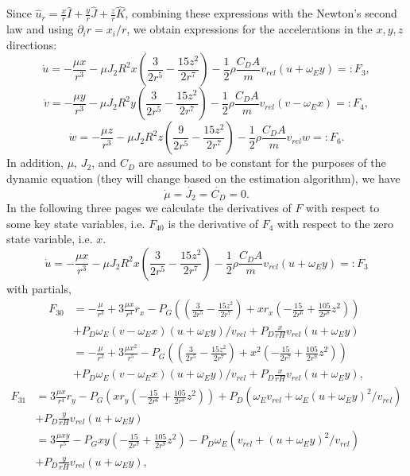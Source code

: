 \documentclass[]{article}
\begin{document}
Since $\hat{u}_r = \frac{x}{r} \hat{I} + \frac{y}{r} \hat{J} + \frac{z}{r} \hat{K}$, combining these expressions with the Newton's second law and using $\partial_i r = x_i/r$, we obtain expressions for the accelerations in the $x,y,z$ directions:
$$
\dot{u} = -\frac{\mu x}{r^3} - \mu J_2 R^2  x \left( \frac{3}{2r^5} - \frac{15z^2}{2r^7} \right) - \frac{1}{2} \rho \frac{C_D A}{m} v_{rel} \left(u + \omega_E y \right) =: F_3,
$$
$$
\dot{v} =  -\frac{\mu y}{r^3} - \mu J_2 R^2 y  \left( \frac{3}{2r^5} - \frac{15z^2}{2r^7} \right) - \frac{1}{2} \rho \frac{C_D A}{m} v_{rel}  \left(v - \omega_E x \right) =: F_4,
$$
$$
\dot{w} =  -\frac{\mu z}{r^3} - \mu J_2 R^2 z  \left( \frac{9}{2r^5} - \frac{15z^2}{2r^7} \right) - \frac{1}{2} \rho \frac{C_D A}{m} v_{rel} w =: F_6.
$$
In addition, $\mu$, $J_2$, and $C_D$ are assumed to be constant for the purposes of the dynamic equation (they will change based on the estimation algorithm), we have
$$
\dot{\mu} = \dot{J_2} = \dot{C_D} = 0.
$$
In the following three pages we calculate the derivatives of $F$ with respect to some key state variables, i.e. $F_{40}$ is the derivative of $F_4$ with respect to the zero state variable, i.e. $x$.
\newpage
$$
\dot{u} = -\frac{\mu x}{r^3} - \mu J_2 R^2  x \left( \frac{3}{2r^5} - \frac{15z^2}{2r^7} \right) - \frac{1}{2} \rho \frac{C_D A}{m} v_{rel} \left(u + \omega_E y \right) =: F_3
$$
with partials,
\begin{eqnarray}
F_{30} & = -\frac{\mu}{r^3} + 3 \frac{\mu x}{r^4} r_x - P_G \left( \left( \frac{3}{2r^5} - \frac{15z^2}{2r^7} \right) + x r_x \left( -\frac{15}{2 r^6} + \frac{105}{2r^8}z^2 \right) \right) \\
& + P_D \omega_E (v-\omega_E x)(u+\omega_E y)/v_{rel} + P_D \frac{x}{r H} v_{rel} (u+\omega_E y)  \\
& = -\frac{\mu}{r^3} + 3 \frac{\mu x^2}{r^5}  - P_G \left( \left( \frac{3}{2r^5} - \frac{15z^2}{2r^7} \right) + x^2 \left( -\frac{15}{2 r^7} + \frac{105}{2r^9}z^2 \right) \right) \\
& + P_D \omega_E (v-\omega_E x)(u+\omega_E y)/v_{rel} + P_D \frac{x}{r H} v_{rel} (u+\omega_E y),
\end{eqnarray}
\begin{eqnarray}
F_{31} & =  3 \frac{\mu x}{r^4} r_y - P_G \left( x r_y \left( -\frac{15}{2 r^6} + \frac{105}{2r^8}z^2 \right) \right) + P_D \left( \omega_E  v_{rel} + \omega_E (u+\omega_E y)^2/v_{rel} \right)\\
& +  P_D \frac{y}{r H} v_{rel} (u+\omega_E y) \\
& =  3 \frac{\mu x y}{r^5} - P_G  x y \left( -\frac{15}{2 r^7} + \frac{105}{2r^9}z^2  \right) - P_D \omega_E  \left( v_{rel} + (u+\omega_E y)^2/v_{rel} \right) \\
& +  P_D \frac{y}{r H} v_{rel} (u+\omega_E y),
\end{eqnarray}
\end{document}
